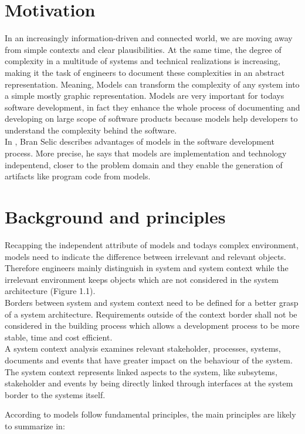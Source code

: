 \section{Motivation}
In an increasingly information-driven and connected world, we are moving away from simple contexts and clear plausibilities. At the same time, the degree of complexity in a multitude of systems and technical realizations is increasing, making it the task of engineers to document these complexities in an abstract representation. Meaning, Models can transform the complexity of any system into a simple mostly graphic representation. Models are very important for todays software development, in fact they enhance the whole process of documenting and developing on large scope of software products because models help developers to understand the complexity behind the software.\\ 
In \cite{BranSelic.2003}, Bran Selic describes advantages of models in the software development process. More precise, he says that models are implementation and technology indepentend, closer to the problem domain and they enable the generation of artifacts like program code from models.



\section{Background and principles}
Recapping the independent attribute of models and todays complex environment, models need to indicate the difference between irrelevant and relevant objects. Therefore engineers mainly distinguish in system and system context while the irrelevant environment keeps objects which are not considered in the system architecture (Figure 1.1). \\
Borders between system and system context need to be defined for a better grasp of a system architecture. Requirements outside of the context border shall not be considered in the building process which allows a development process to be more stable, time and cost efficient.  \\
A system context analysis examines relevant stakeholder, processes, systems, documents and events that have greater impact on the behaviour of the system. 
The system context represents linked aspects to the system, like subsytems, stakeholder and events by being directly linked through interfaces at the system border to the systems itself. \cite{Pohl.2015} 

\newpage
According to \cite{Bernroider.2006} models follow fundamental principles, the main principles are likely to summarize in: 


